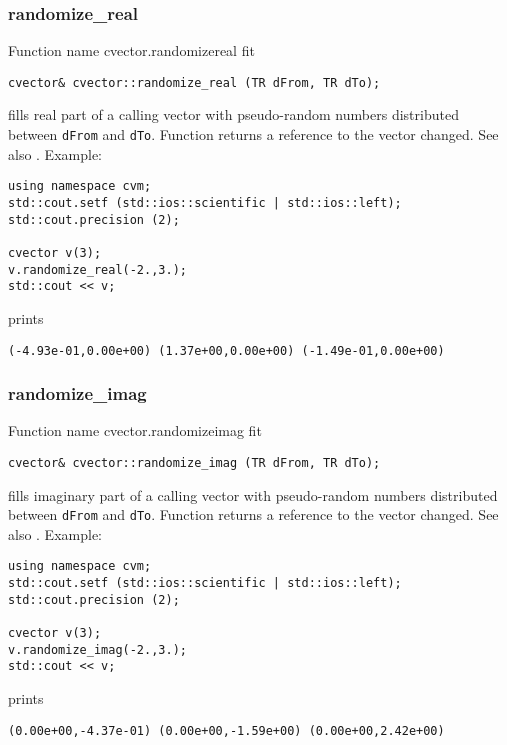 \subsubsection{randomize\_real}
Function%
\pdfdest name {cvector.randomizereal} fit
\begin{verbatim}
cvector& cvector::randomize_real (TR dFrom, TR dTo);
\end{verbatim}
fills  real part of a calling vector with
pseudo-random numbers distributed between
\verb"dFrom" and \verb"dTo".
Function
returns a reference to the vector changed.
See also
.
Example:
\begin{Verbatim}
using namespace cvm;
std::cout.setf (std::ios::scientific | std::ios::left);
std::cout.precision (2);

cvector v(3);
v.randomize_real(-2.,3.);
std::cout << v;
\end{Verbatim}
prints
\begin{Verbatim}
(-4.93e-01,0.00e+00) (1.37e+00,0.00e+00) (-1.49e-01,0.00e+00)
\end{Verbatim}
\newpage


\subsubsection{randomize\_imag}
Function%
\pdfdest name {cvector.randomizeimag} fit
\begin{verbatim}
cvector& cvector::randomize_imag (TR dFrom, TR dTo);
\end{verbatim}
fills  imaginary part of a calling vector with
pseudo-random numbers distributed between
\verb"dFrom" and \verb"dTo".
Function
returns a reference to the vector changed.
See also
.
Example:
\begin{Verbatim}
using namespace cvm;
std::cout.setf (std::ios::scientific | std::ios::left);
std::cout.precision (2);

cvector v(3);
v.randomize_imag(-2.,3.);
std::cout << v;
\end{Verbatim}
prints
\begin{Verbatim}
(0.00e+00,-4.37e-01) (0.00e+00,-1.59e+00) (0.00e+00,2.42e+00)
\end{Verbatim}
\newpage
